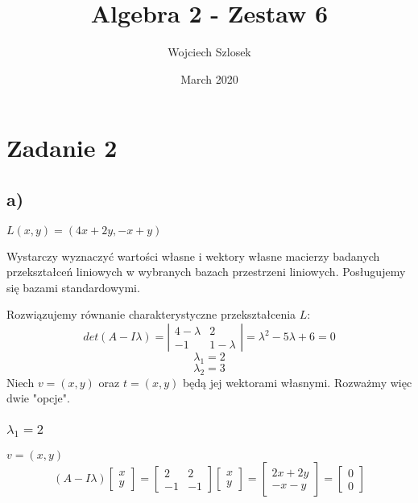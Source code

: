 \documentclass{article}
\title{Algebra 2 - Zestaw 6}
\author{Wojciech Szlosek}
\date{March 2020}
\begin{document}
\maketitle

\section{Zadanie 2}

\subsection{a)}

$L(x,y) = (4x+2y,-x+y)$ \newline

Wystarczy wyznaczyć wartości własne i wektory własne macierzy badanych przekształceń liniowych w wybranych bazach przestrzeni liniowych. Posługujemy się bazami standardowymi. \newline

Rozwiązujemy równanie charakterystyczne przekształcenia $L$:
$$det(A - I\lambda) = \left|\begin{array}{cc}4-\lambda&2\\-1&1-\lambda\end{array}\right| = \lambda^{2}-5\lambda + 6 = 0$$
$$\lambda_{1} = 2$$
$$\lambda_{2} = 3$$
Niech $v = (x,y)$ oraz $t = (x,y)$ będą jej wektorami własnymi.
Rozważmy więc dwie "opcje".

\subsubsection{$\lambda_{1} = 2$}

$v = (x,y)$
$$(A-I\lambda)\left[\begin{array}{c}x\\y\end{array}\right] =\left[\begin{array}{cc}2&2\\-1&-1\end{array}\right] \left[\begin{array}{c}x\\y\end{array}\right] = \left[\begin{array}{c}2x+2y\\-x-y\end{array}\right] = \left[\begin{array}{c}0\\0\end{array}\right] $$
\end{document}
